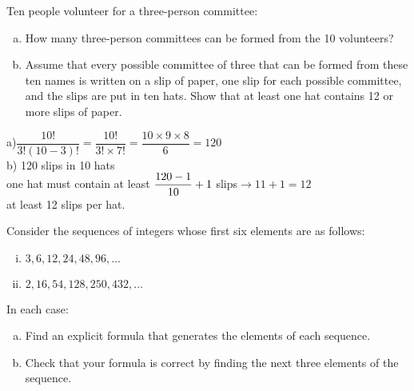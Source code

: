 \documentclass[addpoints,10pt,answers]{exam}
\begin{document}
\begin{questions}
\question[12] 
Ten people volunteer for a three-person committee:
\begin{enumerate}[(a)]
\item 
How many three-person committees can be formed from the 10 volunteers? 
\item 
Assume that every possible committee of three that can be formed from these ten names is written on a slip of paper, one slip for each possible committee, and the slips are put in ten hats. Show that at least one hat contains 12 or more slips of paper.
\end{enumerate}

\begin{solution}
a)$\dfrac{10!}{3!(10-3)!}=\dfrac{10!}{3!\times 7!}=\dfrac{10\times 9\times 8}{6}=120$\\
b) 120 slips in 10 hats \\ one hat must contain at least $\dfrac{120-1}{10}+1\hspace{1mm}$slips$\rightarrow11+1=12$\\ at least 12 slips per hat.
\end{solution}


\question[12] Consider the sequences of integers whose first six elements are as follows:
\begin{enumerate}[(i)]
\item 
$3,6,12,24,48,96, \ldots$
\item 
$2,16,54,128,250, 432, \ldots$
\end{enumerate}

In each case:
\begin{enumerate}[(a)]
\item 
Find an explicit formula that generates the elements of each sequence.
\item 
Check that your formula is correct by finding the next three elements of the sequence.
\end{enumerate}


\end{questions}
\end{document}
